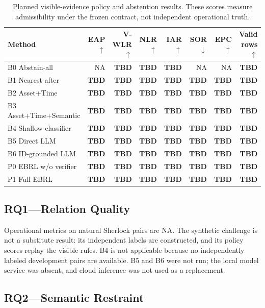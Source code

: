 \documentclass[conference]{IEEEtran}
\newcommand{\NA}{\textsc{NA}}
\newcommand{\TBDv}{\textbf{TBD}}
\begin{document}
\begin{table}[t]
\caption{Planned visible-evidence policy and abstention results. These scores measure admissibility under the frozen contract, not independent operational truth.}
\label{tab:policy-results}
\centering\scriptsize
\begin{tabular}{lrrrrrrr}
\toprule
Method & EAP$\uparrow$ & V-WLR$\uparrow$ & NLR$\uparrow$ & IAR$\uparrow$ & SOR$\downarrow$ & EPC$\uparrow$ & Valid rows$\uparrow$\\
\midrule
B0 Abstain-all & \NA & \TBDv & \TBDv & \TBDv & \NA & \NA & \TBDv\\
B1 Nearest-after & \TBDv & \TBDv & \TBDv & \TBDv & \TBDv & \TBDv & \TBDv\\
B2 Asset+Time & \TBDv & \TBDv & \TBDv & \TBDv & \TBDv & \TBDv & \TBDv\\
B3 Asset+Time+Semantic & \TBDv & \TBDv & \TBDv & \TBDv & \TBDv & \TBDv & \TBDv\\
B4 Shallow classifier & \TBDv & \TBDv & \TBDv & \TBDv & \TBDv & \TBDv & \TBDv\\
B5 Direct LLM & \TBDv & \TBDv & \TBDv & \TBDv & \TBDv & \TBDv & \TBDv\\
B6 ID-grounded LLM & \TBDv & \TBDv & \TBDv & \TBDv & \TBDv & \TBDv & \TBDv\\
P0 EBRL w/o verifier & \TBDv & \TBDv & \TBDv & \TBDv & \TBDv & \TBDv & \TBDv\\
P1 Full EBRL & \TBDv & \TBDv & \TBDv & \TBDv & \TBDv & \TBDv & \TBDv\\
\bottomrule
\end{tabular}
\end{table}

\subsection{RQ1---Relation Quality}

Operational metrics on natural Sherlock pairs are \NA{}. The synthetic challenge is not a substitute result: its independent labels are constructed, and its policy scores replay the visible rules. B4 is not applicable because no independently labeled development pairs are available. B5 and B6 were not run; the local model service was absent, and cloud inference was not used as a replacement.

\subsection{RQ2---Semantic Restraint}
\end{document}
